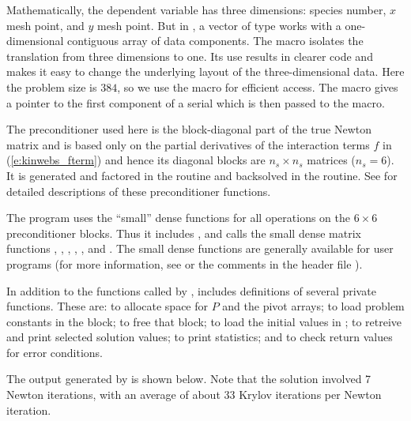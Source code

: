 Mathematically, the dependent variable has three dimensions: species
number, $x$ mesh point, and $y$ mesh point.  But in {\nvecs}, a vector of
type  works with a one-dimensional contiguous array of
data components. The macro  isolates the translation from
three dimensions to one. Its use results in clearer code and makes it
easy to change the underlying layout of the three-dimensional data. 
Here the problem size is $384$, so we use the  macro
for efficient  access. The  macro gives
a pointer to the first component of a serial  which is then
passed to the  macro.

The preconditioner used here is the block-diagonal part of the true Newton
matrix and is based only on the partial derivatives of the interaction terms $f$
in (\ref{e:kinwebs_fterm}) and hence its  diagonal blocks are $n_s \times n_s$ matrices
($n_s = 6$).
It is generated and factored in the  routine and
backsolved in the  routine.  
See  for detailed descriptions
of these preconditioner functions.

The program  uses the ``small'' dense functions for all operations 
on the $6 \times 6$ preconditioner blocks.  
Thus it includes , and calls the small dense matrix
functions , , 
, , , and .
The small dense functions are generally available for {\kinsol} user programs
(for more information, see  or the comments in the header file
).

In addition to the functions called by {\kinsol},  includes
definitions of several private functions.  These are: 
to allocate space for $P$ and the pivot arrays; 
to load problem constants in the  block;  to free
that block;  to load the initial values in ; 
 to retreive and print selected solution values;
 to print statistics; and 
to check return values for error conditions.

The output generated by  is shown below.  Note that the
solution involved 7 Newton iterations, with an average of about 33
Krylov iterations per Newton iteration.



